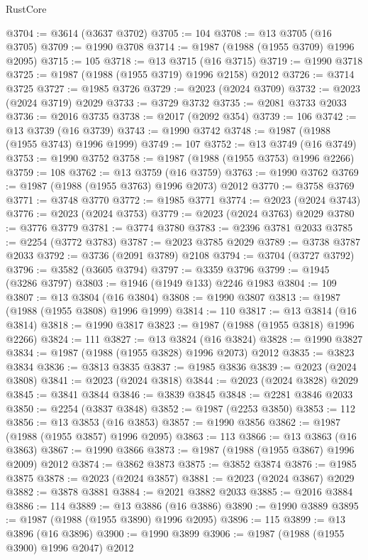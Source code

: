 \begin{lexlean}{RustCore}
\begin{coremodule}
@3704 := @3614 (@3637 @3702)
@3705 := 104
@3708 := @13 @3705 (@16 @3705)
@3709 := @1990 @3708
@3714 := @1987 (@1988 (@1955 @3709) @1996 @2095)
@3715 := 105
@3718 := @13 @3715 (@16 @3715)
@3719 := @1990 @3718
@3725 := @1987 (@1988 (@1955 @3719) @1996 @2158) @2012
@3726 := @3714 @3725
@3727 := @1985 @3726
@3729 := @2023 (@2024 @3709)
@3732 := @2023 (@2024 @3719) @2029
@3733 := @3729 @3732
@3735 := @2081 @3733 @2033
@3736 := @2016 @3735
@3738 := @2017 (@2092 @354)
@3739 := 106
@3742 := @13 @3739 (@16 @3739)
@3743 := @1990 @3742
@3748 := @1987 (@1988 (@1955 @3743) @1996 @1999)
@3749 := 107
@3752 := @13 @3749 (@16 @3749)
@3753 := @1990 @3752
@3758 := @1987 (@1988 (@1955 @3753) @1996 @2266)
@3759 := 108
@3762 := @13 @3759 (@16 @3759)
@3763 := @1990 @3762
@3769 := @1987 (@1988 (@1955 @3763) @1996 @2073) @2012
@3770 := @3758 @3769
@3771 := @3748 @3770
@3772 := @1985 @3771
@3774 := @2023 (@2024 @3743)
@3776 := @2023 (@2024 @3753)
@3779 := @2023 (@2024 @3763) @2029
@3780 := @3776 @3779
@3781 := @3774 @3780
@3783 := @2396 @3781 @2033
@3785 := @2254 (@3772 @3783)
@3787 := @2023 @3785 @2029
@3789 := @3738 @3787 @2033
@3792 := @3736 (@2091 @3789) @2108
@3794 := @3704 (@3727 @3792)
@3796 := @3582 (@3605 @3794)
@3797 := @3359 @3796
@3799 := @1945 (@3286 @3797)
@3803 := @1946 (@1949 @133) @2246 @1983
@3804 := 109
@3807 := @13 @3804 (@16 @3804)
@3808 := @1990 @3807
@3813 := @1987 (@1988 (@1955 @3808) @1996 @1999)
@3814 := 110
@3817 := @13 @3814 (@16 @3814)
@3818 := @1990 @3817
@3823 := @1987 (@1988 (@1955 @3818) @1996 @2266)
@3824 := 111
@3827 := @13 @3824 (@16 @3824)
@3828 := @1990 @3827
@3834 := @1987 (@1988 (@1955 @3828) @1996 @2073) @2012
@3835 := @3823 @3834
@3836 := @3813 @3835
@3837 := @1985 @3836
@3839 := @2023 (@2024 @3808)
@3841 := @2023 (@2024 @3818)
@3844 := @2023 (@2024 @3828) @2029
@3845 := @3841 @3844
@3846 := @3839 @3845
@3848 := @2281 @3846 @2033
@3850 := @2254 (@3837 @3848)
@3852 := @1987 (@2253 @3850)
@3853 := 112
@3856 := @13 @3853 (@16 @3853)
@3857 := @1990 @3856
@3862 := @1987 (@1988 (@1955 @3857) @1996 @2095)
@3863 := 113
@3866 := @13 @3863 (@16 @3863)
@3867 := @1990 @3866
@3873 := @1987 (@1988 (@1955 @3867) @1996 @2009) @2012
@3874 := @3862 @3873
@3875 := @3852 @3874
@3876 := @1985 @3875
@3878 := @2023 (@2024 @3857)
@3881 := @2023 (@2024 @3867) @2029
@3882 := @3878 @3881
@3884 := @2021 @3882 @2033
@3885 := @2016 @3884
@3886 := 114
@3889 := @13 @3886 (@16 @3886)
@3890 := @1990 @3889
@3895 := @1987 (@1988 (@1955 @3890) @1996 @2095)
@3896 := 115
@3899 := @13 @3896 (@16 @3896)
@3900 := @1990 @3899
@3906 := @1987 (@1988 (@1955 @3900) @1996 @2047) @2012

\end{coremodule}
\end{lexlean}
